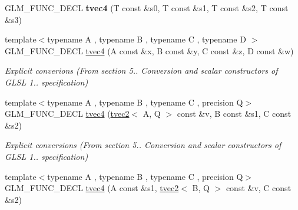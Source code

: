 \begin{DoxyCompactItemize}
\item 
\hypertarget{structglm_1_1detail_1_1tvec4_a7b81815685a8d9e0fbdd9b660750ef26}{G\-L\-M\-\_\-\-F\-U\-N\-C\-\_\-\-D\-E\-C\-L {\bfseries tvec4} (T const \&s0, T const \&s1, T const \&s2, T const \&s3)}\label{structglm_1_1detail_1_1tvec4_a7b81815685a8d9e0fbdd9b660750ef26}

\item 
\hypertarget{structglm_1_1detail_1_1tvec4_aa19075717a5439da09d279cc4b2b9a73}{{\footnotesize template$<$typename A , typename B , typename C , typename D $>$ }\\G\-L\-M\-\_\-\-F\-U\-N\-C\-\_\-\-D\-E\-C\-L \hyperlink{structglm_1_1detail_1_1tvec4_aa19075717a5439da09d279cc4b2b9a73}{tvec4} (A const \&x, B const \&y, C const \&z, D const \&w)}\label{structglm_1_1detail_1_1tvec4_aa19075717a5439da09d279cc4b2b9a73}

\begin{DoxyCompactList}\small\item\em Explicit converions (From section 5.. Conversion and scalar constructors of G\-L\-S\-L 1.. specification) \end{DoxyCompactList}\item 
\hypertarget{structglm_1_1detail_1_1tvec4_a5fa780e942ec21ec77ec2fe9d8f57cf3}{{\footnotesize template$<$typename A , typename B , typename C , precision Q$>$ }\\G\-L\-M\-\_\-\-F\-U\-N\-C\-\_\-\-D\-E\-C\-L \hyperlink{structglm_1_1detail_1_1tvec4_a5fa780e942ec21ec77ec2fe9d8f57cf3}{tvec4} (\hyperlink{structglm_1_1detail_1_1tvec2}{tvec2}$<$ A, Q $>$ const \&v, B const \&s1, C const \&s2)}\label{structglm_1_1detail_1_1tvec4_a5fa780e942ec21ec77ec2fe9d8f57cf3}

\begin{DoxyCompactList}\small\item\em Explicit conversions (From section 5.. Conversion and scalar constructors of G\-L\-S\-L 1.. specification) \end{DoxyCompactList}\item 
\hypertarget{structglm_1_1detail_1_1tvec4_ad3de2f66c42e8d6c46d9f85abef13ea2}{{\footnotesize template$<$typename A , typename B , typename C , precision Q$>$ }\\G\-L\-M\-\_\-\-F\-U\-N\-C\-\_\-\-D\-E\-C\-L \hyperlink{structglm_1_1detail_1_1tvec4_ad3de2f66c42e8d6c46d9f85abef13ea2}{tvec4} (A const \&s1, \hyperlink{structglm_1_1detail_1_1tvec2}{tvec2}$<$ B, Q $>$ const \&v, C const \&s2)}\label{structglm_1_1detail_1_1tvec4_ad3de2f66c42e8d6c46d9f85abef13ea2}


\end{DoxyCompactItemize}
